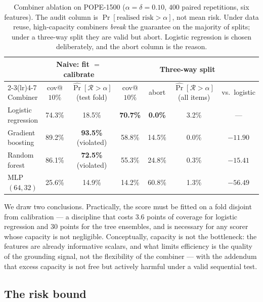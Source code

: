 \documentclass{article}
\theoremstyle{plain}
\theoremstyle{definition}
\theoremstyle{remark}
\newcommand{\Risk}{\mathcal{R}}
\begin{document}
\begin{table}[t]
\centering
\caption{Combiner ablation on POPE-1500 ($\alpha=\delta=0.10$, $400$ paired repetitions, six
features). The audit column is $\Pr[\text{realised risk}>\alpha]$, not mean risk. Under data
reuse, high-capacity combiners \emph{break} the guarantee on the majority of splits; under a
three-way split they are valid but abort. Logistic regression is chosen deliberately, and the
abort column is the reason.}
\label{tab:combiner}
\footnotesize
\begin{tabular}{lcccccc}
\toprule
& \multicolumn{2}{c}{Naive: fit $=$ calibrate} & \multicolumn{4}{c}{Three-way split}\\
\cmidrule(lr){2-3}\cmidrule(lr){4-7}
Combiner & cov@$10\%$ & $\widehat{\Pr}[\Risk>\alpha]$ (test fold) & cov@$10\%$ & abort
& $\widehat{\Pr}[\Risk>\alpha]$ (all items) & vs.\ logistic\\
\midrule
Logistic regression & 74.3\% & 18.5\% & \textbf{70.7\%} & \textbf{0.0\%} & 3.2\% & ---\\
Gradient boosting   & 89.2\% & \textbf{93.5\%} (violated) & 58.8\% & 14.5\% & 0.0\% & $-11.90$\\
Random forest       & 86.1\% & \textbf{72.5\%} (violated) & 55.3\% & 24.8\% & 0.3\% & $-15.41$\\
MLP $(64,32)$       & 25.6\% & 14.9\% & 14.2\% & 60.8\% & 1.3\% & $-56.49$\\
\bottomrule
\end{tabular}
\end{table}

We draw two conclusions. Practically, the score must be fitted on a fold disjoint from
calibration --- a discipline that costs $3.6$ points of coverage for logistic regression and
$30$ points for the tree ensembles, and is necessary for any scorer whose capacity is not
negligible. Conceptually, capacity is not the bottleneck: the features are already informative
scalars, and what limits efficiency is the quality of the grounding signal, not the flexibility
of the combiner --- with the addendum that excess capacity is not free but actively harmful under
a valid sequential test.

\subsection{The risk bound}
\end{document}
